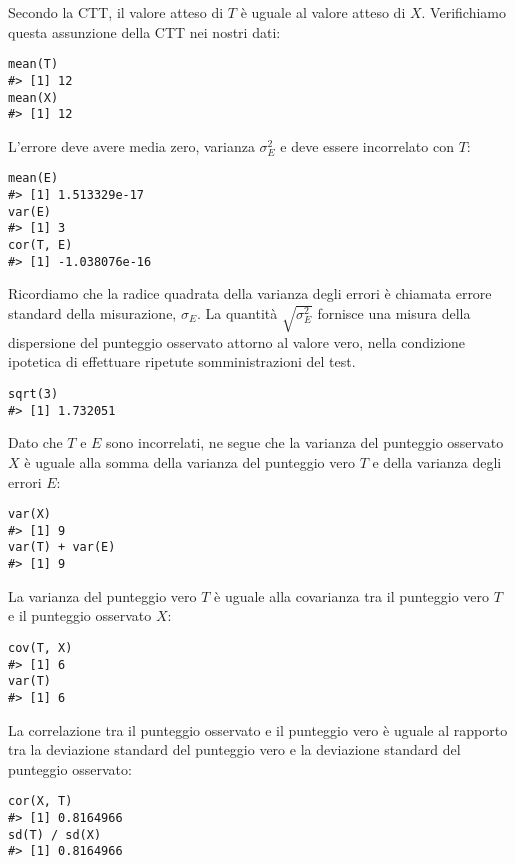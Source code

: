 \noindent
Secondo la CTT, il valore atteso di $T$ è uguale al valore
atteso di $X$.
Verifichiamo questa assunzione della CTT nei nostri dati:
\begin{lstlisting}
mean(T)
#> [1] 12
mean(X)
#> [1] 12
\end{lstlisting}
L'errore deve avere media zero, varianza $\sigma_E^2$ e deve essere incorrelato con $T$:
\begin{lstlisting}
mean(E)
#> [1] 1.513329e-17
var(E)
#> [1] 3
cor(T, E)
#> [1] -1.038076e-16
\end{lstlisting}
Ricordiamo che la radice quadrata della varianza degli errori è chiamata errore standard della misurazione, $\sigma_E$. La quantità $\sqrt{\sigma_E^2}$ fornisce una misura della dispersione del punteggio osservato attorno al valore vero, nella condizione ipotetica di effettuare ripetute somministrazioni del test.
\begin{lstlisting}
sqrt(3)
#> [1] 1.732051
\end{lstlisting}
Dato che  $T$ e $E$ sono incorrelati, ne segue che la varianza del punteggio osservato $X$ è uguale alla somma della varianza del punteggio vero $T$ e della varianza degli errori $E$:
\begin{lstlisting}
var(X)
#> [1] 9
var(T) + var(E)
#> [1] 9
\end{lstlisting}
La varianza del punteggio vero $T$ è uguale alla covarianza tra il punteggio vero $T$ e il punteggio osservato $X$:
\begin{lstlisting}
cov(T, X)
#> [1] 6
var(T)
#> [1] 6
\end{lstlisting}
La correlazione tra il punteggio osservato e il punteggio vero è uguale al rapporto tra la deviazione standard del punteggio vero e la deviazione standard del punteggio osservato:
\begin{lstlisting}
cor(X, T)
#> [1] 0.8164966
sd(T) / sd(X)
#> [1] 0.8164966
\end{lstlisting}

